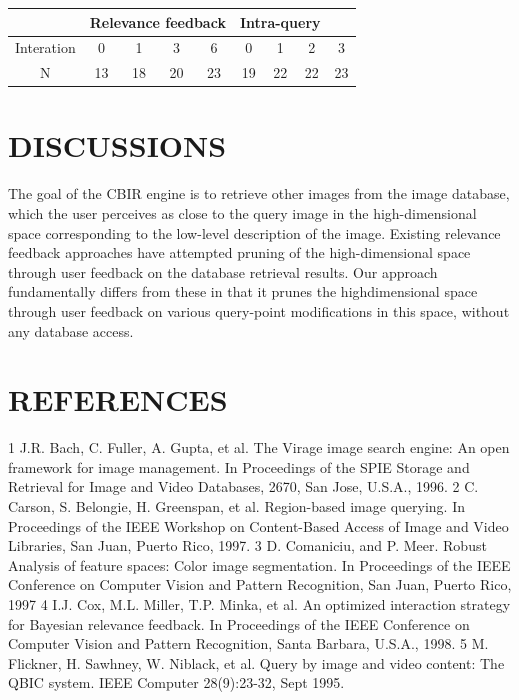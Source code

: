 \documentclass{acmart}
\begin{document}
    \begin{center}
    \begin{tabular}{|c|c|c|c|c|c|c|c|c|}
            
        
        \hline
         
         &\multicolumn{4}{c}{Relevance feedback}& \multicolumn{3}{c}{Intra-query } &\\
         \hline
       Interation & 0 &1 &3 &6 &0 &1 &2 &3 \\
       \hline
       N &13 &18 &20 &23 &19 &22 &22 &23 \\
       \hline
    \end{tabular}
    \label{tbl:1}
    \end{center}

\newpage
\newpage
{}
\section*{DISCUSSIONS}

The goal of the CBIR engine is to retrieve other images from the image database, which the user perceives as close to the query image in the high-dimensional space corresponding to the low-level description of the image. Existing relevance feedback approaches have attempted pruning of the high-dimensional space through user feedback on the database retrieval results. Our approach fundamentally differs from these in that it prunes the highdimensional space through user feedback on various query-point modifications in this space, without any database access.

\newpage
{}
\section*{REFERENCES}


1	J.R. Bach, C. Fuller, A. Gupta, et al. The Virage image search engine: An open framework for image management. In Proceedings of the SPIE Storage and Retrieval for Image and Video Databases, 2670, San Jose, U.S.A., 1996.
2	C. Carson, S. Belongie, H. Greenspan, et al. Region-based image querying. In Proceedings of the IEEE Workshop on Content-Based Access of Image and Video Libraries, San Juan, Puerto Rico, 1997.
3	D. Comaniciu, and P. Meer. Robust Analysis of feature spaces: Color image segmentation. In Proceedings of the IEEE Conference on Computer Vision and Pattern Recognition, San Juan, Puerto Rico, 1997
4	I.J. Cox, M.L. Miller, T.P. Minka, et al. An optimized interaction strategy for Bayesian relevance feedback. In Proceedings of the IEEE Conference on Computer Vision and Pattern Recognition, Santa Barbara, U.S.A., 1998.
5	M. Flickner, H. Sawhney, W. Niblack, et al. Query by image and video content: The QBIC system. IEEE Computer 28(9):23-32, Sept 1995.
\end{document}
